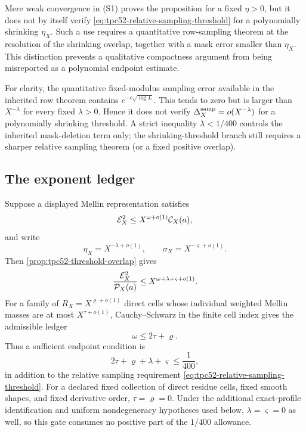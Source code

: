 Mere weak convergence in \textup{(S1)} proves the proposition for a fixed
\(\eta>0\), but it does not by itself verify
\eqref{eq:tpc52-relative-sampling-threshold} for a polynomially shrinking
\(\eta_X\).  Such a use requires a quantitative row-sampling theorem at the
resolution of the shrinking overlap, together with a mask error smaller than
\(\eta_X\).  This distinction prevents a qualitative compactness argument
from being misreported as a polynomial endpoint estimate.

For clarity, the quantitative fixed-modulus sampling error available in the
inherited row theorem contains \(e^{-c\sqrt{\log L}}\).  This tends to zero
but is larger than \(X^{-\lambda}\) for every fixed \(\lambda>0\).  Hence it
does not verify \(\Delta_X^{\rm samp}=o(X^{-\lambda})\) for a polynomially shrinking
threshold.  A strict inequality \(\lambda<1/400\) controls the inherited
mask-deletion term only; the shrinking-threshold branch still requires a
sharper relative sampling theorem (or a fixed positive overlap).

\subsection{The exponent ledger}

Suppose a displayed Mellin representation satisfies
\begin{equation}
 \mathcal E_X^2\le X^{\omega+o(1)}\mathcal C_X(a),
 \label{eq:tpc52-envelope-carrier-exponent}
\end{equation}
and write
\begin{equation}
 \eta_X=X^{-\lambda+o(1)},
 \qquad
 \sigma_X=X^{-\varsigma+o(1)}.
 \label{eq:tpc52-threshold-exponents}
\end{equation}
Then \cref{prop:tpc52-threshold-overlap} gives
\begin{equation}
 \frac{\mathcal E_X^2}{\mathcal P_X(a)}
 \le X^{\omega+\lambda+\varsigma+o(1)}.
 \label{eq:tpc52-threshold-condition-exponent}
\end{equation}
For a family of \(R_X=X^{\varrho+o(1)}\) direct cells whose individual
weighted Mellin masses are at most \(X^{\tau+o(1)}\), Cauchy--Schwarz in the
finite cell index gives the admissible ledger
\begin{equation}
 \omega\le 2\tau+\varrho.
 \label{eq:tpc52-cell-mass-exponent}
\end{equation}
Thus a sufficient endpoint condition is
\begin{equation}
 \boxed{2\tau+\varrho+\lambda+\varsigma\le \frac1{400},}
 \label{eq:tpc52-one-over-four-hundred-ledger}
\end{equation}
in addition to the relative sampling requirement
\eqref{eq:tpc52-relative-sampling-threshold}.  For a declared fixed collection
of direct residue cells, fixed smooth shapes, and fixed derivative order,
\(\tau=\varrho=0\).  Under the additional exact-profile identification and
uniform nondegeneracy hypotheses used below,
\(\lambda=\varsigma=0\) as well, so this gate consumes no positive part of
the \(1/400\) allowance.

